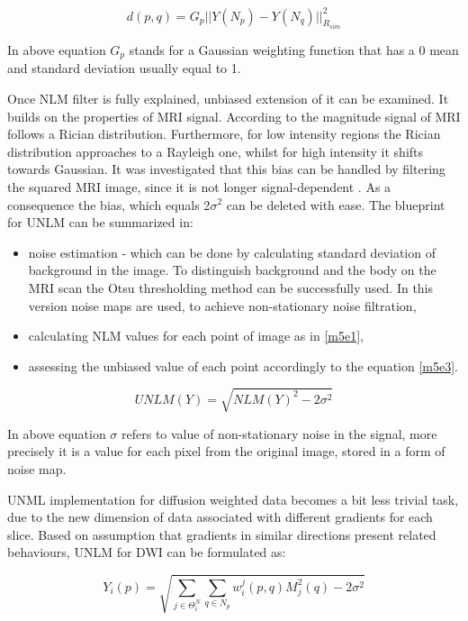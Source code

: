 \begin{equation}
d(p,q)=G_{p}||Y(N_{p})-Y(N_{q})||_{R_{sim}}^{2}\label{m5e6}
\end{equation}

In above equation $G_{p}$ stands for a Gaussian weighting function
that has a 0 mean and standard deviation usually equal to 1.


Once NLM filter is fully explained, unbiased extension of it can be
examined. It builds on the properties of MRI signal. According to
\cite{5a1} the magnitude signal of MRI follows a Rician distribution.
Furthermore, for low intensity regions the Rician distribution approaches
to a Rayleigh one, whilst for high intensity it shifts towards Gaussian.
It was investigated that this bias can be handled by filtering the
squared MRI image, since it is not longer signal-dependent \cite{5a1}.
As a consequence the bias, which equals 2$\sigma^{2}$ \cite{5a3}
can be deleted with ease. The blueprint for UNLM can be summarized
in:
\begin{itemize}
\item noise estimation - which can be done by calculating standard deviation
of background in the image. To distinguish
background and the body on the MRI scan the Otsu thresholding method
\cite{5a4} can be successfully used. In this version noise maps are used, to achieve
non-stationary noise filtration, 
\item calculating NLM values for each point of image as in \ref{m5e1}, 
\item assessing the unbiased value of each point accordingly to the equation
\ref{m5e3}.
\end{itemize}
\begin{equation}
UNLM(Y)=\sqrt{NLM(Y)^{2}-2\sigma^{2}}\label{m5e3}
\end{equation}

In above equation $\sigma$ refers to value of non-stationary noise in the signal, more precisely
it is a value for each pixel from the original image, stored in a form of noise map.

UNML implementation for diffusion weighted data becomes a bit less
trivial task, due to the new dimension of data associated with different gradients for each slice.
Based on assumption that gradients in similar directions
present related behaviours, UNLM for DWI can be formulated as:

\begin{equation}
Y_{i}(p)=\sqrt{\sum_{j\in\Theta_{i}^{N}}^ {}\sum_{q\in N_{p}}^ {}w_{i}^{j}(p,q)M_{j}^{2}(q)-2\sigma^{2}}
\end{equation}

